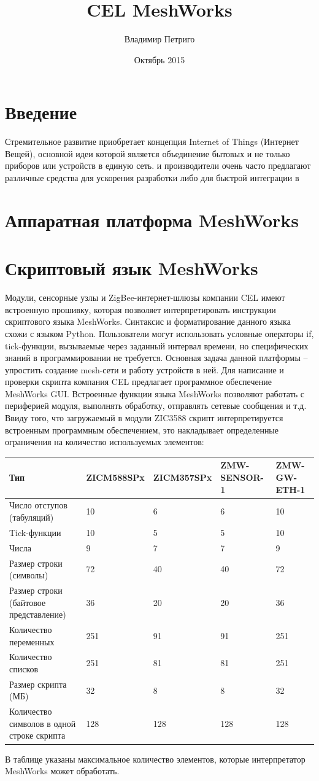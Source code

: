 \documentclass[12pt]{article}
\title{CEL MeshWorks}
\author{Владимир Петриго}
\date{Октябрь 2015}
\begin{document}
\maketitle

\section{Введение}

Стремительное развитие приобретает концепция Internet of Things (Интернет Вещей),
основной идеи которой является объединение бытовых и не только приборов или 
устройств в единую сеть. и производители очень часто предлагают различные 
средства для ускорения разработки либо для быстрой интеграции в 
\section{Аппаратная платформа MeshWorks}
\section{Скриптовый язык MeshWorks}

Модули, сенсорные узлы и ZigBee-интернет-шлюзы компании CEL имеют встроенную 
прошивку, которая позволяет интерпретировать инструкции скриптового языка 
MeshWorks. Синтаксис и форматирование данного языка схожи с языком Python. 
Пользователи могут использовать условные операторы if, tick-функции, вызываемые 
через заданный интервал времени, но специфических знаний в программировании не 
требуется. Основная задача данной платформы – упростить создание mesh-сети и 
работу устройств в ней.
Для написание и проверки скрипта компания CEL предлагает программное обеспечение 
MeshWorks GUI. Встроенные функции языка MeshWorks позволяют работать с периферией 
модуля, выполнять обработку, отправлять сетевые сообщения и т.д.
Ввиду того, что загружаемый в модули ZIC3588 скрипт интерпретируется встроенным 
программным обеспечением, это накладывает определенные ограничения на количество 
используемых элементов:
\begin{center}
\begin{tabular}{ |p{3cm}|p{2cm}|p{2cm}|p{2cm}|p{2cm}| } 
 \hline
 Тип & ZICM588SPx & ZICM357SPx & ZMW-SENSOR-1 & ZMW-GW-ETH-1 \\
 \hline
 Число отступов (табуляций) & 10 & 6 & 6 & 10 \\ 
 Tick-функции & 10 & 5 & 5 & 10 \\ 
 Числа & 9 & 7 & 7 & 9 \\ 
 Размер строки (символы) & 72 & 40 & 40 & 72 \\
 Размер строки (байтовое представление) & 36 & 20 & 20 & 36 \\
 Количество переменных & 251 & 91 & 91 & 251 \\
 Количество списков & 251 & 81 & 81 & 251 \\
 Размер скрипта (МБ) & 32 & 8 & 8 & 32 \\
 Количество символов в одной строке скрипта & 128 & 128 & 128 & 128 \\
 \hline
\end{tabular}
\end{center}
В таблице указаны максимальное количество элементов, которые интерпретатор MeshWorks может обработать.
\end{document}
